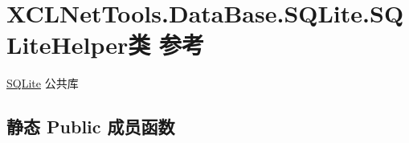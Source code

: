 \hypertarget{class_x_c_l_net_tools_1_1_data_base_1_1_s_q_lite_1_1_s_q_lite_helper}{\section{X\-C\-L\-Net\-Tools.\-Data\-Base.\-S\-Q\-Lite.\-S\-Q\-Lite\-Helper类 参考}
\label{class_x_c_l_net_tools_1_1_data_base_1_1_s_q_lite_1_1_s_q_lite_helper}
}


\hyperlink{namespace_x_c_l_net_tools_1_1_data_base_1_1_s_q_lite}{S\-Q\-Lite} 公共库  


\subsection*{静态 Public 成员函数}
